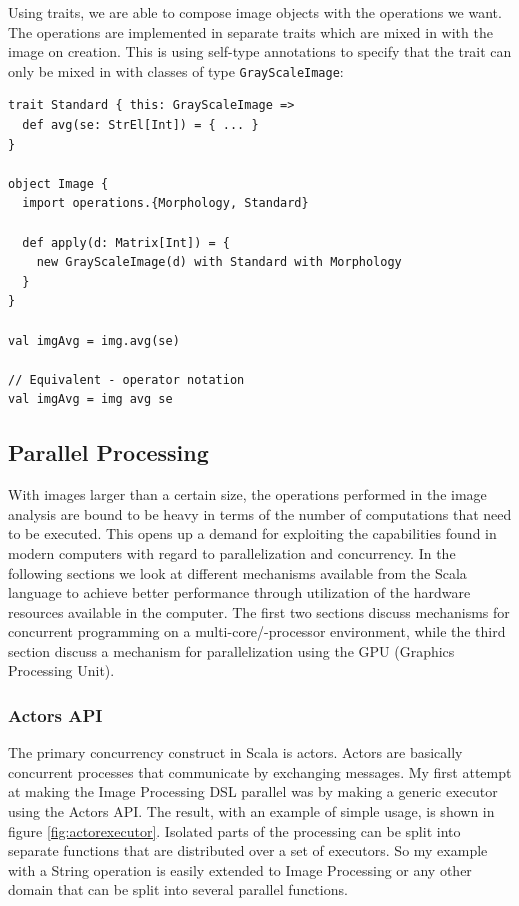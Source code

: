 \documentclass[a4paper,english]{report}
\begin{document}
Using traits, we are able to compose image objects with the operations
we want. The operations are implemented in separate traits which are
mixed in with the image on creation. This is using self-type
annotations to specify that the trait can only be mixed in with
classes of type \texttt{GrayScaleImage}:

\begin{lstlisting}
trait Standard { this: GrayScaleImage =>
  def avg(se: StrEl[Int]) = { ... }
}

object Image {
  import operations.{Morphology, Standard}

  def apply(d: Matrix[Int]) = {
    new GrayScaleImage(d) with Standard with Morphology
  }
}

val imgAvg = img.avg(se)

// Equivalent - operator notation
val imgAvg = img avg se
\end{lstlisting}

\subsection{Parallel Processing}

With images larger than a certain size, the operations performed in
the image analysis are bound to be heavy in terms of the number of
computations that need to be executed. This opens up a demand for
exploiting the capabilities found in modern computers with regard to
parallelization and concurrency. In the following sections we look at
different mechanisms available from the Scala language to achieve
better performance through utilization of the hardware resources
available in the computer. The first two sections discuss mechanisms
for concurrent programming on a multi-core/-processor environment,
while the third section discuss a mechanism for parallelization using
the GPU (Graphics Processing Unit).

\subsubsection{Actors API}
\label{sec:actors}

The primary concurrency construct in Scala is actors. Actors are
basically concurrent processes that communicate by exchanging
messages\cite{hal06}. My first attempt at making the Image Processing
DSL parallel was by making a generic executor using the Actors
API. The result, with an example of simple usage, is shown in figure
\vref{fig:actorexecutor}. Isolated parts of the processing can be
split into separate functions that are distributed over a set of
executors. So my example with a String operation is easily extended to
Image Processing or any other domain that can be split into several
parallel functions.
\end{document}
